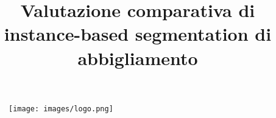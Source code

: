 \documentclass[12pt,a4paper,oneside,openright]{book}
\begin{document}
\begin{figure}
	\centering
	\texttt{[image: images/logo.png]}
\end{figure}

\title{Valutazione comparativa di instance-based segmentation di abbigliamento}

\providecommand{\entitle}{Comparative evaluation of instance-based apparel segmentation}

\providecommand{\autore}{Pier Carlo Cadoppi}                        %
\providecommand{\matricola}{276645}
\providecommand{\principaladviser}{Chiar.mo~Prof. Andrea Prati}  %
\providecommand{\firstreader}{Leonardo Rossi}            %
\providecommand{\annoacc}{2018/19}
\providecommand{\tipo}{Triennale} %
\providecommand{\corso}{Informatica, Elettronica e delle Telecomunicazioni} %


\titlep

\frontmatter

   
   \tableofcontents
   \listoffigures
   \listoftables

\clearpage

\mainmatter
 
 
 
 
 
 

\appendix
\renewcommand{\chaptermark}[1]{\markboth{{\appendixname}\ \thechapter.\hspace{1em}#1}{}}

\clearpage
{}

%



\end{document}
